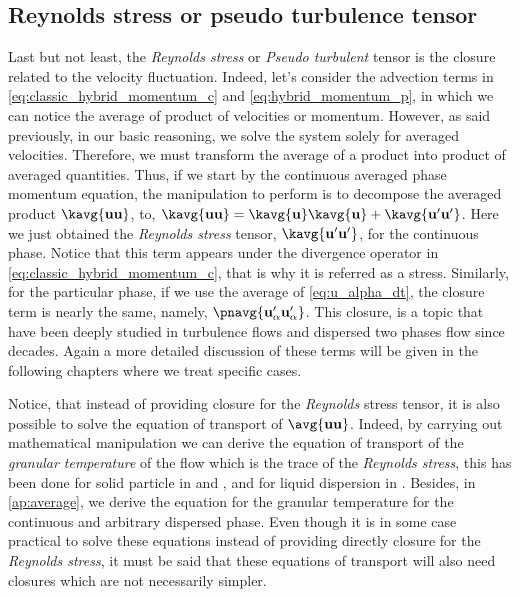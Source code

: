 \subsection{Reynolds stress or pseudo turbulence tensor}

Last but not least, the \textit{Reynolds stress} or \textit{Pseudo turbulent} tensor is the closure related to the velocity fluctuation. 
Indeed, let's consider the advection terms in \ref{eq:classic_hybrid_momentum_c} and \ref{eq:hybrid_momentum_p}, in which we can notice the average of product of velocities or momentum. 
However, as said previously, in our basic reasoning, we solve the system solely for averaged velocities.
Therefore, we must transform the average of a product into product of averaged quantities. 
Thus, if we start by the continuous averaged phase momentum equation, the manipulation to perform is to decompose the averaged product $\kavg{\textbf{u} \textbf{u}}$, to, $\kavg{\textbf{u} \textbf{u}} = \kavg{\textbf{u}} \kavg{\textbf{u}} + \kavg{\textbf{u}' \textbf{u}'}$. 
Here we just obtained the \textit{Reynolds stress} tensor, $\kavg{\textbf{u}' \textbf{u}'}$, for the continuous phase. 
Notice that this term appears under the divergence operator in \ref{eq:classic_hybrid_momentum_c}, that is why it is referred as a stress. 
Similarly, for the particular phase, if we use the average of \ref{eq:u_alpha_dt}, the closure term is nearly the same, namely, $\pnavg{\textbf{u}_\alpha'\textbf{u}_\alpha'}$.
This closure, is a topic that have been deeply studied in turbulence flows and dispersed two phases flow since decades. 
Again a more detailed discussion of these terms will be given in the following chapters where we treat specific cases. 

Notice, that instead of providing closure for the \textit{Reynolds} stress tensor, it is also possible to solve the equation of transport of $\avg{\textbf{uu}}$. 
Indeed, by carrying out mathematical manipulation we can derive the equation of transport of the \textit{granular temperature} of the flow which is the trace of the \textit{Reynolds stress}, this has been done for solid particle in \citet{jackson2000dynamics} and \citet{nott2011suspension}, and for liquid dispersion in \citet{morel2015mathematical}.
Besides, in \ref{ap:average}, we derive the equation for the granular temperature for the continuous and arbitrary dispersed phase. 
Even though it is in some case practical to solve these equations instead of providing directly closure for the \textit{Reynolds stress}, it must be said that these equations of transport will also need closures which are not necessarily simpler. 

